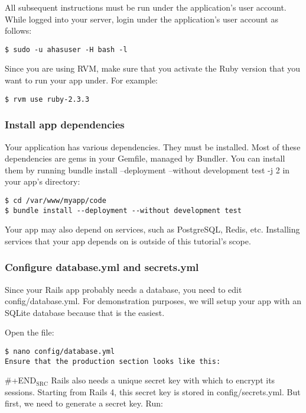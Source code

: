 \documentclass[11pt]{article}
\begin{document}
All subsequent instructions must be run under the application's user account. While logged into your server, login under the application's user account as follows:

\begin{verbatim}
$ sudo -u ahasuser -H bash -l
\end{verbatim}

Since you are using RVM, make sure that you activate the Ruby version that you want to run your app under. For example:

\begin{verbatim}
$ rvm use ruby-2.3.3
\end{verbatim}

\subsubsection{Install app dependencies}
\label{sec:org959f1da}

Your application has various dependencies. They must be installed. Most of these dependencies are gems in your Gemfile, managed by Bundler. You can install them by running bundle install --deployment --without development test -j 2 in your app's directory:

\begin{verbatim}
$ cd /var/www/myapp/code
$ bundle install --deployment --without development test
\end{verbatim}

Your app may also depend on services, such as PostgreSQL, Redis, etc. Installing services that your app depends on is outside of this tutorial's scope.

\subsubsection{Configure database.yml and secrets.yml}
\label{sec:org00956ec}

Since your Rails app probably needs a database, you need to edit config/database.yml. For demonstration purposes, we will setup your app with an SQLite database because that is the easiest.

Open the file:
\begin{verbatim}
$ nano config/database.yml
Ensure that the production section looks like this:
\end{verbatim}


\#+END\(_{\text{SRC}}\)
Rails also needs a unique secret key with which to encrypt its sessions. Starting from Rails 4, this secret key is stored in config/secrets.yml. But first, we need to generate a secret key. Run:
\end{document}
